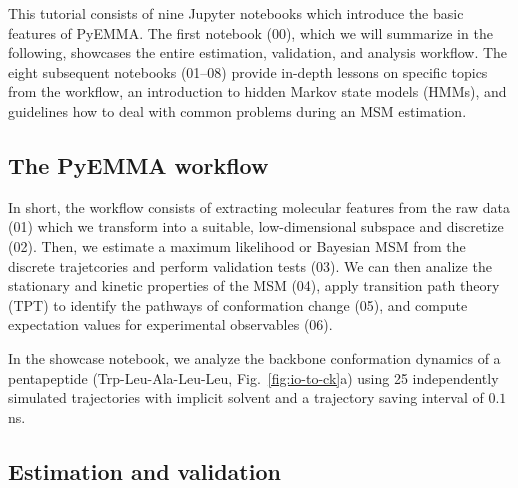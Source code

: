 \documentclass[9pt,tutorial]{livecoms}
\begin{document}
This tutorial consists of nine Jupyter notebooks which introduce the basic features of PyEMMA. The first notebook (00), which we will summarize in the following, showcases the entire estimation, validation, and analysis workflow. The eight subsequent notebooks (01--08) provide in-depth lessons on specific topics from the workflow, an introduction to hidden Markov state models (HMMs), and guidelines how to deal with common problems during an MSM estimation.

\subsection{The PyEMMA workflow}

In short, the workflow consists of extracting molecular features from the raw data (01) which we transform into a suitable, low-dimensional subspace and discretize (02). Then, we estimate a maximum likelihood or Bayesian MSM from the discrete trajetcories and perform validation tests (03). We can then analize the stationary and kinetic properties of the MSM (04), apply transition path theory (TPT) to identify the pathways of conformation change (05), and compute expectation values for experimental observables (06).

In the showcase notebook, we analyze the backbone conformation dynamics of a pentapeptide (Trp-Leu-Ala-Leu-Leu, Fig.~\ref{fig:io-to-ck}a) using 25 independently simulated trajectories with implicit solvent and a trajectory saving interval of $0.1$ ns.~\cite{pyemma}

\subsection{Estimation and validation}
\end{document}
